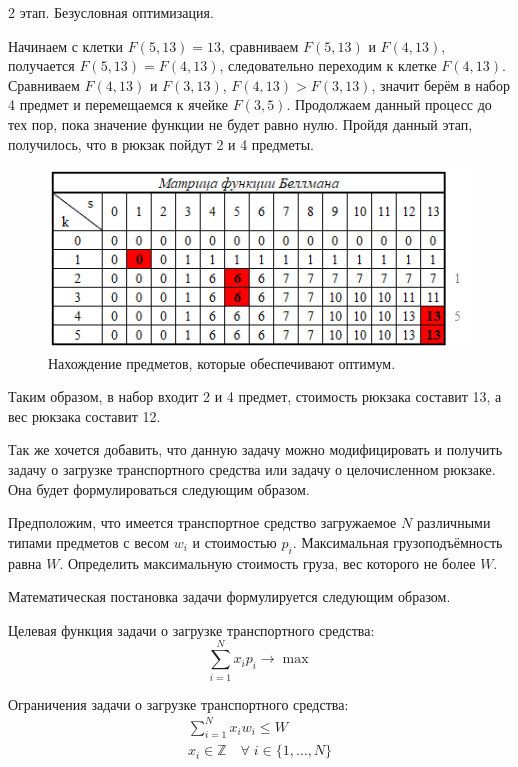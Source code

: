 2 этап. Безусловная оптимизация.

Начинаем с клетки $F(5,13)=13$, сравниваем $F(5,13)$ и $F(4,13)$, получается $F(5,13)=F(4,13)$, следовательно переходим к клетке $F(4,13)$. Сравниваем $F(4,13)$ и $F(3,13)$, $F(4,13)>F(3,13)$, значит берём в набор 4 предмет и перемещаемся к ячейке $F(3,5)$. Продолжаем данный процесс до тех пор, пока значение функции не будет равно нулю. Пройдя данный этап, получилось, что в рюкзак пойдут 2 и 4 предметы.

\begin{figure}[h]
  \centering \includegraphics[scale=1]{content/images/opt_knapsack.png}
  \caption{Нахождение предметов, которые обеспечивают оптимум.}
  \label{fig:opt_knapsack}
\end{figure}

Таким образом, в набор входит 2 и 4 предмет, стоимость рюкзака составит 13, а вес рюкзака составит 12.

Так же хочется добавить, что данную задачу можно модифицировать и получить задачу о загрузке транспортного средства или задачу о целочисленном рюкзаке. Она будет формулироваться следующим образом.

Предположим, что имеется транспортное средство загружаемое $N$ различными типами предметов с весом $w_i$ и стоимостью $p_i$. Максимальная грузоподъёмность равна $W$. Определить максимальную стоимость груза, вес которого не более $W$.

Математическая постановка задачи формулируется следующим образом.

Целевая функция задачи о загрузке транспортного средства:
\begin{equation}
    \sum_{i=1}^Nx_ip_i \longrightarrow \max
\end{equation}

Ограничения задачи о загрузке транспортного средства:
\begin{equation}
\begin{multlined}
    \sum_{i=1}^Nx_iw_i \leq W\\
    x_i \in \mathbb{Z} \quad \forall \; i \in \{1, \hdots, N\}
\end{multlined}
\end{equation}



